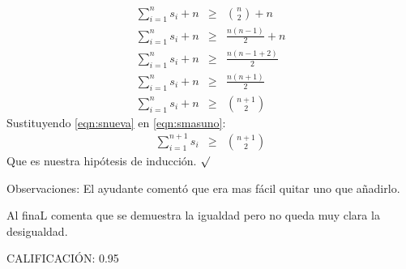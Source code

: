 \documentclass[9pt,spanish]{article}
\begin{document}
\begin{itemize}
	  \begin{eqnarray}
	  \displaystyle\sum_{i=1}^{n} s_i +n  &\geq& {n \choose 2} +n  \nonumber \\
	  \displaystyle\sum_{i=1}^{n} s_i +n  &\geq& \displaystyle\frac{n(n-1)}{2} +n  \nonumber \\
	  \displaystyle\sum_{i=1}^{n} s_i +n  &\geq& \displaystyle\frac{n(n-1+2)}{2} \nonumber \\
	  \displaystyle\sum_{i=1}^{n} s_i +n  &\geq& \displaystyle\frac{n(n+1)}{2} \nonumber  \\
	  \label{eqn:snueva}
	  \displaystyle\sum_{i=1}^{n} s_i +n &\geq& {n+1 \choose 2} 
	  \end{eqnarray}
Sustituyendo \ref{eqn:snueva} en \ref{eqn:smasuno}:
\begin{eqnarray}
	  \displaystyle\sum_{i=1}^{n+1} s_i &\geq& {n+1 \choose 2} 
	  \end{eqnarray}
Que es nuestra hip\'otesis de inducci\'on. $\surd$
	
\end{itemize}  
Observaciones: El ayudante comentó que era mas fácil quitar uno que añadirlo.

Al finaL comenta que se demuestra la igualdad pero no queda muy clara la desigualdad.

CALIFICACIÓN: 0.95
\end{document}
